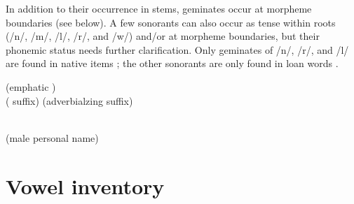 In addition to their occurrence in stems, geminates occur at morpheme boundaries (see  below). A few sonorants can also occur as tense  within roots (/n/, /m/, /l/, /r/, and /w/) and/or at morpheme boundaries, but their phonemic status needs further clarification. Only geminates of /n/, /r/, and /l/ are found in native items ; the other sonorants are only found in loan words .
%
\begin{exe}
	\ex	\label{ex:gemination C1 phon}
	\TabPositions{11em}
		 	 \tab {} (emphatic )	\\
		 ( suffix)	\tab {} (adverbialzing suffix)	\\
		 	

	\ex	\label{ex:gemination C2 phon}
	\TabPositions{11em}
			 	 \tab 	{} 	\\
			 	 \tab 	{} (male personal name)		
\end{exe}



\section{Vowel inventory}
\label{sec:Vowel inventory}

